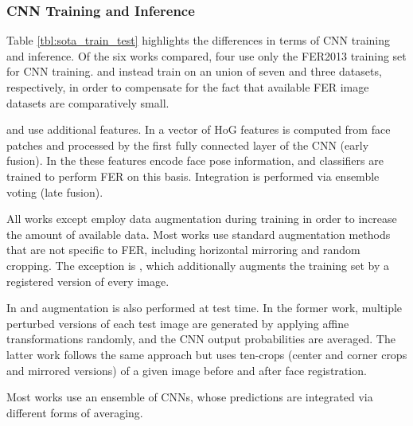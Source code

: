 \documentclass[conference,10pt,a4paper]{IEEEtran}
\begin{document}
\subsubsection{CNN Training and Inference} \label{ssub:cnn_training_inference}

Table \ref{tbl:sota_train_test} highlights the differences in terms of CNN training and inference. Of the six works compared, four use only the FER2013 training set for CNN training. \cite{mollahosseini15} and \cite{zhang2015} instead train on an union of seven and three datasets, respectively, in order to compensate for the fact that available FER image datasets are comparatively small.

\cite{zhang2015} and \cite{kim16cvpr} use additional features. In \cite{zhang2015} a vector of HoG features is computed from face patches and processed by the first fully connected layer of the CNN (early fusion). In \cite{kim16cvpr} the these features encode face pose information, and classifiers are trained to perform FER on this basis. Integration is performed via ensemble voting (late fusion).

All works except \cite{zhang2015} employ data augmentation during training in order to increase the amount of available data. Most works use standard augmentation methods that are not specific to FER, including horizontal mirroring and random cropping. The exception is \cite{kim16cvpr}, which additionally augments the training set by a registered version of every image.

In \cite{yu15} and \cite{kim16cvpr} augmentation is also performed at test time. In the former work, multiple perturbed versions of each test image are generated by applying affine transformations randomly, and the CNN output probabilities are averaged. The latter work follows the same approach but uses ten-crops (center and corner crops and mirrored versions) of a given image before and after face registration.

Most works use an ensemble of CNNs, whose predictions are integrated via different forms of averaging.
\end{document}
